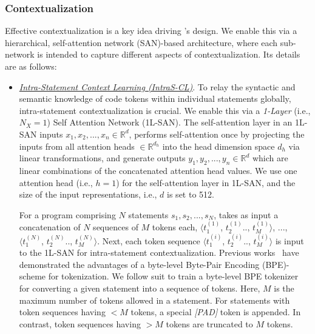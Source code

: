 \subsubsection{Contextualization}
Effective contextualization is a key idea driving \tool's design. We enable this via a hierarchical, self-attention network (SAN)-based architecture, where each sub-network is intended to capture different aspects of contextualization. Its details are as follows:

\begin{itemize}[leftmargin=*, listparindent=\parindent, parsep=0pt, itemsep=\topsep]
    \item \underline{\textit{Intra-Statement Context Learning (IntraS-CL)}}. To relay the syntactic and semantic knowledge of code tokens within individual statements globally, intra-statement contextualization is crucial. We enable this via a \textit{1-Layer} (i.e., $N_X$$=$$1$) Self Attention Network (1L-SAN). The self-attention layer in an 1L-SAN inputs $x_1, x_2, ..., x_n \in \mathbb{R}^d$, performs self-attention once by projecting the inputs from all attention heads $\in\mathbb{R}^{d_h}$ into the head dimension space $d_h$ via linear transformations, and generate outputs $y_1, y_2, ..., y_n \in\mathbb{R}^d$ which are linear combinations of the concatenated attention head values. We use one attention head (i.e., $h$$=$$1$) for the self-attention layer in 1L-SAN, and the size of the input representations, i.e., $d$ is set to 512.

    \hangindent=0.7cm For a program comprising $N$ statements $s_1, s_2, ..., s_N$, \tool takes as input a concatenation of $N$ sequences of $M$ tokens each, $\langle t_1^{(1)}$, $t_2^{(1)}$.., $t_M^{(1)} \rangle$, ..., $\langle t_1^{(N)}$, $t_2^{(N)}$.., $t_M^{(N)} \rangle$. Next, each token sequence $\langle t_1^{(i)}$, $t_2^{(i)}$.., $t_M^{(i)} \rangle$ is input to the 1L-SAN for intra-statement contextualization. Previous works~\cite{radford2019language, liu2019roberta} have demonstrated the advantages of a byte-level Byte-Pair Encoding (BPE)-scheme for tokenization. We follow suit to train a byte-level BPE tokenizer for converting a given statement into a sequence of tokens. Here, $M$ is the maximum number of tokens allowed in a statement. For statements with token sequences having ${<}M$ tokens, a special \textit{[PAD]} token is appended. In contrast, token sequences having ${>}M$ tokens are truncated to $M$ tokens.


\end{itemize}
